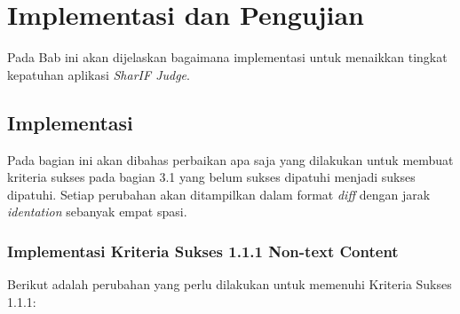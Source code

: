 \chapter{Implementasi dan Pengujian}
\label{chap:implementasi}

Pada Bab ini akan dijelaskan bagaimana implementasi untuk menaikkan tingkat kepatuhan aplikasi \textit{SharIF Judge}.

\section{Implementasi}
\label{sec:implementasi}

Pada bagian ini akan dibahas perbaikan apa saja yang dilakukan untuk membuat kriteria sukses pada bagian 3.1
yang belum sukses dipatuhi menjadi sukses dipatuhi. Setiap perubahan akan ditampilkan dalam format \textit{diff} dengan jarak \textit{identation} sebanyak empat spasi.

\subsection{Implementasi Kriteria Sukses 1.1.1 Non-text Content}
\label{subsec:implementasi_A_1.1.1}

Berikut adalah perubahan yang perlu dilakukan untuk memenuhi Kriteria Sukses 1.1.1:

